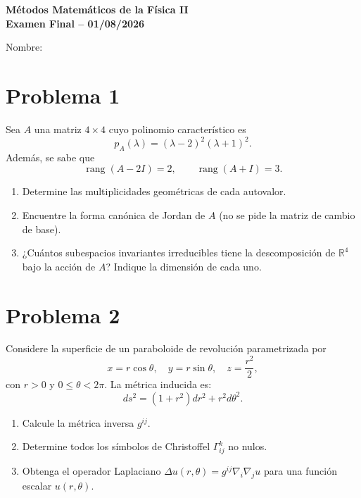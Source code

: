 \documentclass[12pt]{article}
\begin{document}
\begin{center}
\textbf{\Large Métodos Matemáticos de la Física II} \\
\textbf{\large Examen Final – 01/08/2026}
\end{center}

Nombre: \hrulefill

\vspace{1cm}

\section*{Problema 1}

Sea $A$ una matriz $4 \times 4$ cuyo polinomio característico es
\[p_A(\lambda) = (\lambda - 2)^2(\lambda + 1)^2.\]
Además, se sabe que
\[ \operatorname{rang}(A - 2I) = 2, \qquad \operatorname{rang}(A + I) = 3. \]

\begin{enumerate}
\item[(a)] Determine las multiplicidades geométricas de cada autovalor.
\item[(b)] Encuentre la forma canónica de Jordan de $A$ (no se pide la matriz de cambio de base).
\item[(c)] ¿Cuántos subespacios invariantes irreducibles tiene la descomposición de $\mathbb{R}^4$ bajo la acción de $A$? Indique la dimensión de cada uno.
\end{enumerate}

\vspace{1cm}

\section*{Problema 2}

Considere la superficie de un paraboloide de revolución parametrizada por
\[x = r \cos \theta, \quad y = r \sin \theta, \quad z = \frac{r^2}{2},\]
con $r > 0$ y $0 \le \theta < 2\pi$. La métrica inducida es:
\[ds^2 = (1 + r^2) dr^2 + r^2 d\theta^2.\]

\begin{enumerate}
\item[(a)] Calcule la métrica inversa $g^{ij}$.
\item[(b)] Determine todos los símbolos de Christoffel $\Gamma_{ij}^k$ no nulos.
\item[(c)] Obtenga el operador Laplaciano $\Delta u(r, \theta) = g^{ij}\nabla_i\nabla_j u$ para una función escalar $u(r, \theta)$.
\end{enumerate}
\end{document}
